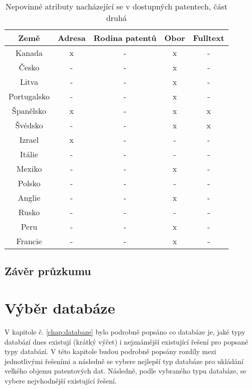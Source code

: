	\begin{table}[H]
	\centering
	\begin{tabular}{|c|c|c|c|c|} 
	\hline
	\textbf{Země}    &  \textbf{Adresa} & \textbf{Rodina patentů} & \textbf{Obor} & \textbf{Fulltext} \\
	\hline
	Kanada & x & - & x & - \\
	\hline
	Česko & - & - & x & - \\
	\hline
	Litva & - & - & x & - \\
	\hline
	Portugalsko & - & - & x & - \\
	\hline
	Španělsko & x & - & x & x \\
	\hline
	Švédsko & - & - & x & x \\
	\hline
	Izrael & x & - & - & - \\
	\hline
	Itálie & - & - & - & - \\
	\hline
	Mexiko & - & - & x & - \\
	\hline
	Polsko & - & - & - & - \\
	\hline
	Anglie & - & - & x & - \\
	\hline
	Rusko & - & - & - & - \\
	\hline
	Peru & - & - & x & - \\
	\hline
	Francie & - & - & x & - \\
	\hline
	\end{tabular}
	\caption{Nepovinné atributy nacházející se v dostupných patentech, část druhá}
	\label{tab:table_attributes_notcrit2}
	\end{table}


\subsection{Závěr průzkumu}


\section{Výběr databáze}
V kapitole č. \ref{chap:databaze} bylo podrobně popsáno co databáze je, jaké typy databází dnes existují (krátký výčet) i nejznámější existující řešení pro popsané typy databází. V této kapitole budou podrobně popsány rozdíly mezi jednotlivými řešeními a následně se vybere nejlepší typ databáze pro ukládání velkého objemu patentových dat. Následně, podle vybraného typu databáze, se vybere nejvhodnější existující řešení.

